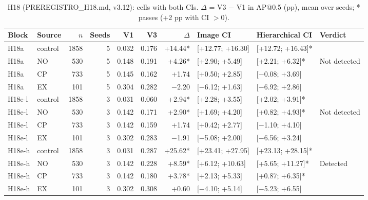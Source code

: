 \begin{table}[H]\centering\small
\caption{H18 (PREREGISTRO\_H18.md, v3.12): cells with both CIs. $\Delta$ = V3 $-$ V1 in AP@0.5 (pp), mean over seeds; * passes (+2 pp with CI $>0$).}
\begin{tabular}{@{}llrrrrrlll@{}}\toprule
Block & Source & $n$ & Seeds & V1 & V3 & $\Delta$ & Image CI & Hierarchical CI & Verdict \\\midrule
H18a & control & 1858 & 5 & 0.032 & 0.176 & +14.44* & [+12.77; +16.30] & [+12.72; +16.43]* &  \\
H18a & NO & 530 & 5 & 0.148 & 0.191 & +4.26* & [+2.90; +5.49] & [+2.21; +6.32]* & Not detected \\
H18a & CP & 733 & 5 & 0.145 & 0.162 & +1.74 & [+0.50; +2.85] & [$-$0.08; +3.69] &  \\
H18a & EX & 101 & 5 & 0.304 & 0.282 & $-$2.20 & [$-$6.12; +1.63] & [$-$6.92; +2.86] &  \\
H18e-l & control & 1858 & 3 & 0.031 & 0.060 & +2.94* & [+2.28; +3.55] & [+2.02; +3.91]* &  \\
H18e-l & NO & 530 & 3 & 0.142 & 0.171 & +2.90* & [+1.69; +4.20] & [+0.82; +4.93]* & Not detected \\
H18e-l & CP & 733 & 3 & 0.142 & 0.159 & +1.74 & [+0.42; +2.77] & [$-$1.10; +4.10] &  \\
H18e-l & EX & 101 & 3 & 0.302 & 0.283 & $-$1.91 & [$-$5.08; +2.00] & [$-$6.56; +3.24] &  \\
H18e-h & control & 1858 & 3 & 0.031 & 0.287 & +25.62* & [+23.41; +27.95] & [+23.13; +28.15]* &  \\
H18e-h & NO & 530 & 3 & 0.142 & 0.228 & +8.59* & [+6.12; +10.63] & [+5.65; +11.27]* & Detected \\
H18e-h & CP & 733 & 3 & 0.142 & 0.180 & +3.78* & [+2.13; +5.33] & [+0.87; +6.35]* &  \\
H18e-h & EX & 101 & 3 & 0.302 & 0.308 & +0.60 & [$-$4.10; +5.14] & [$-$5.23; +6.55] &  \\
\bottomrule\end{tabular}\end{table}

